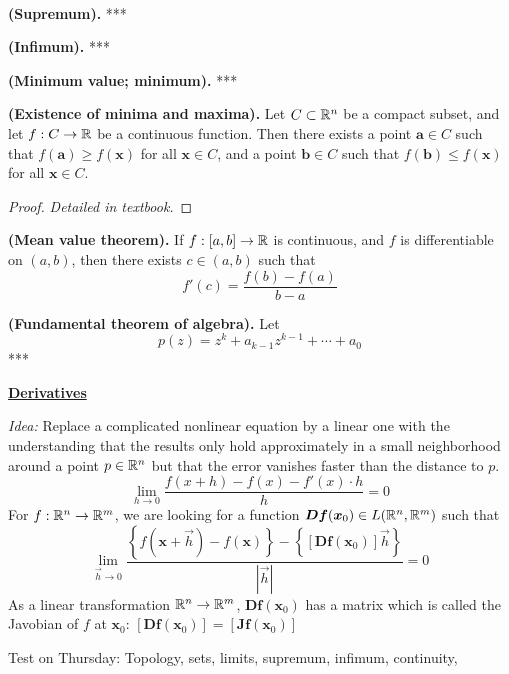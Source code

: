 \\

\begin{defn}
  \textbf{(Supremum).} ***
\end{defn}

\begin{defn}
  \textbf{(Infimum).} ***
\end{defn}

\begin{defn}
  \textbf{(Minimum value; minimum).} ***
\end{defn}

\begin{theorem}
  \textbf{(Existence of minima and maxima).} Let $C\subset \mathbb{R}^n$ be a compact subset, and let $f : C\rightarrow \mathbb{R}$ be a continuous function. Then there exists a point $\bm{a}\in C$ such that $f(\bm{a})\geq f(\bm{x})$ for all $\bm{x}\in C$, and a point $\bm{b}\in C$ such that $f(\bm{b})\leq f(\bm{x})$ for all $\bm{x}\in C$.
\end{theorem}
\begin{proof}
  \textit{Detailed in textbook. }
\end{proof}

\theorem
{
  \textbf{(Mean value theorem).} If $f : [a,b] \rightarrow \mathbb{R}$ is continuous, and $f$ is differentiable on $(a,b)$, then there exists $c\in (a,b)$ such that
  \[f'(c)=\frac{f(b)-f(a)}{b-a}\]
}

\theorem
{
  \textbf{(Fundamental theorem of algebra).} Let
  \[p(z)=z^k+a_{k-1}z^{k-1}+\cdots + a_0\]
  ***
}

\textbf{\ul{Derivatives}}

\textit{Idea:} Replace a complicated nonlinear equation by a linear one with the understanding that the results only hold approximately in a small neighborhood around a point $p\in \mathbb{R}^n$ but that the error vanishes faster than the distance to $p$.
\[\lim_{h\rightarrow 0} \frac{f(x+h)-f(x)-f'(x)\cdot h}{h}=0\]
For $f : \mathbb{R}^n \rightarrow \mathbb{R}^m$, we are looking for a function $\bm{Df}(\bm{x}_0)\in L(\mathbb{R}^n,\mathbb{R}^m)$ such that
\[\lim_{\vec{h}\rightarrow 0} \frac{\left\{f(\bm{x}+\vec{h})-f(\bm{x})\right\}-\left\{[\bm{Df}(\bm{x}_0)]\vec{h}\right\}}{|\vec{h}|}=0\]
As a linear transformation $\mathbb{R}^n\rightarrow \mathbb{R}^m$, $\bm{Df}(\bm{x}_0)$ has a matrix which is called the Javobian of $f$ at $\bm{x}_0$: $[\bm{Df}(\bm{x}_0)]=[\bm{Jf}(\bm{x}_{0})]$

Test on Thursday:
Topology, sets, limits, supremum, infimum, continuity,
